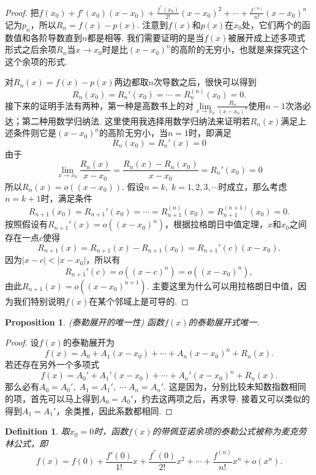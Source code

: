 \documentclass{article}
\newtheorem{proposition}[theorem]{Proposition}
\newtheorem{definition}[theorem]{Definition}
\begin{document}
\begin{proof}
把$f(x_0) + f'(x_0)(x-x_0) + \frac{f^{''}(x_0)}{2!}(x-x_0)^2 + \cdots + \frac{f^{(n)}}{n!}(x-x_0)^n$记为$p_n$，所以$R_n = f(x) - p(x)$. 注意到$f(x)$和$p(x)$在$x_0$处，它们两个的函数值和各阶导数直到$n$都是相等. 我们需要证明的是当$f(x)$被展开成上述多项式形式之后余项$R_n$当$x \rightarrow x_0$时是比$(x-x_0)^n$的高阶的无穷小，也就是来探究这个这个余项的形式. 

对$R_n(x) = f(x) - p(x)$两边都取$n$次导数之后，很快可以得到
$$
R_n(x_0) = R_n'(x_0) = \cdots = R_n^{(n)}(x_0) = 0.
$$
接下来的证明手法有两种，{\color{red}第一种是高数书上的对$\lim\limits_{x \rightarrow x_0} \frac{R_n}{(x-x_0)^n}$使用$n-1$次洛必达}；{\color{blue}第二种用数学归纳法}. 这里使用我选择用数学归纳法来证明若$R_n(x)$满足上述条件则它是$(x-x_0)^n$的高阶无穷小，当$n=1$时，即满足
$$
R_n(x_0) = R_n'(x) = 0
$$
由于
$$
\lim\limits_{x \rightarrow x_0} \frac{R_n(x)}{x-x_0}= \frac{R_n(x) - R_n(x_0)}{x-x_0} = R_n'(x_0) = 0
$$
所以$R_n(x) = o((x-x_0))$. 假设$n=k,\; k =1,2,3,\cdots$时成立，那么考虑$n=k+1$时，满足条件
$$
R_{n+1}(x_0) = R_{n+1}'(x_0) = \cdots = R_{n+1}^{(n)}(x_0) = R_{n+1}^{(n+1)}(x_0)  = 0.
$$
按照假设有$R_{n+1}'(x) = o((x-x_0)^n)$，根据拉格朗日中值定理，$x$和$x_0$之间存在一点$c$使得
$$
R_{n+1}(x) = R_{n+1}(x) - R_{n+1}(x_0) =R_{n+1}'(c)(x-x_0). 
$$
因为$|x-c| < |x-x_0|$，所以有
$$
R_{n+1}'(c) = o((x-c)^n) = o((x-x_0)^n),
$$
由此$R_{n+1}(x) = o((x-x_0)^{n+1})$. 主要这里为什么可以用拉格朗日中值，因为我们特别说明$f(x)$在某个邻域上是可导的.
\end{proof}

\begin{proposition}
\rm {\color{red} (泰勒展开的唯一性)} 函数$f(x)$的泰勒展开式唯一.
\end{proposition}

\begin{proof}
设$f(x)$的泰勒展开为
$$
f(x) = A_0 + A_1(x-x_0) + \cdots + A_n(x-x_0)^n + R_n(x).
$$
若还存在另外一个多项式
$$
f(x) = A_0' + A_1'(x-x_0) + \cdots + A_n'(x-x_0)^n + R_n(x).
$$
那么必有$A_0 = A_0',\; A_1 = A_1',\;\cdots \; A_n = A_n'$. 这是因为，分别比较未知数指数相同的项，首先可以马上得到$A_0 = A_0'$，约去这两项之后，再求导. 接着又可以类似的得到$A_1 = A_1'$，余类推，因此系数都相同.
\end{proof}

\begin{definition}
\rm 取$x_0 = 0$时，函数$f(x)$的带佩亚诺余项的泰勒公式被称为{\color{red}麦克劳林}公式，即
$$
f(x) = f(0)+\frac{f'(0)}{1!}x + \frac{f^{''}(0)}{2!}x^2 + \cdots + \frac{f^{(n)}}{n!}x^n + o(x^n).
$$
\end{definition}
\end{document}
